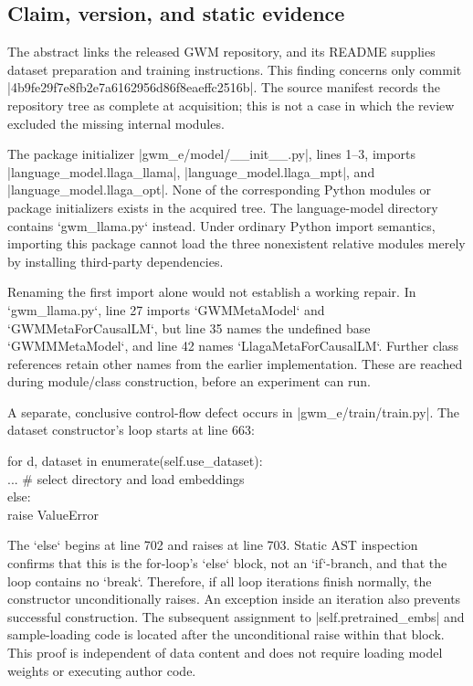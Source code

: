 \documentclass[10pt]{article}
\begin{document}
\subsection*{Claim, version, and static evidence}
The abstract links the released GWM repository, and its README supplies dataset preparation and training instructions. This finding concerns only commit |4b9fe29f7e8fb2e7a6162956d86f8eaeffc2516b|. The source manifest records the repository tree as complete at acquisition; this is not a case in which the review excluded the missing internal modules.\par
The package initializer |gwm\_e/model/\_\_init\_\_.py|, lines 1–3, imports |language\_model.llaga\_llama|, |language\_model.llaga\_mpt|, and |language\_model.llaga\_opt|. None of the corresponding Python modules or package initializers exists in the acquired tree. The language-model directory contains `gwm\_llama.py` instead. Under ordinary Python import semantics, importing this package cannot load the three nonexistent relative modules merely by installing third-party dependencies.\par
Renaming the first import alone would not establish a working repair. In `gwm\_llama.py`, line 27 imports `GWMMetaModel` and `GWMMetaForCausalLM`, but line 35 names the undefined base `GWMMMetaModel`, and line 42 names `LlagaMetaForCausalLM`. Further class references retain other names from the earlier implementation. These are reached during module/class construction, before an experiment can run.\par
A separate, conclusive control-flow defect occurs in |gwm\_e/train/train.py|. The dataset constructor’s loop starts at line 663:\par
{\ttfamily\footnotesize for d, dataset in enumerate(self.use\_dataset):\\
    ...  \# select directory and load embeddings\\
else:\\
    raise ValueError}\par
The `else` begins at line 702 and raises at line 703. Static AST inspection confirms that this is the for-loop’s `else` block, not an `if`-branch, and that the loop contains no `break`. Therefore, if all loop iterations finish normally, the constructor unconditionally raises. An exception inside an iteration also prevents successful construction. The subsequent assignment to |self.pretrained\_embs| and sample-loading code is located after the unconditional raise within that block. This proof is independent of data content and does not require loading model weights or executing author code.\par
\end{document}
